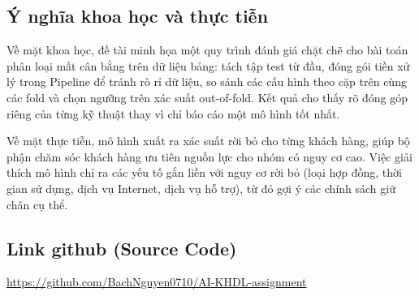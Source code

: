 \subsection{Ý nghĩa khoa học và thực tiễn}
Về mặt khoa học, đề tài minh họa một quy trình đánh giá chặt chẽ cho bài toán phân loại mất cân bằng trên dữ liệu bảng: tách tập test từ đầu, đóng gói tiền xử lý trong Pipeline để tránh rò rỉ dữ liệu, so sánh các cấu hình theo cặp trên cùng các fold và chọn ngưỡng trên xác suất out-of-fold. Kết quả cho thấy rõ đóng góp riêng của từng kỹ thuật thay vì chỉ báo cáo một mô hình tốt nhất.

Về mặt thực tiễn, mô hình xuất ra xác suất rời bỏ cho từng khách hàng, giúp bộ phận chăm sóc khách hàng ưu tiên nguồn lực cho nhóm có nguy cơ cao. Việc giải thích mô hình chỉ ra các yếu tố gắn liền với nguy cơ rời bỏ (loại hợp đồng, thời gian sử dụng, dịch vụ Internet, dịch vụ hỗ trợ), từ đó gợi ý các chính sách giữ chân cụ thể.

\subsection{Link github (Source Code)}
\url{https://github.com/BachNguyen0710/AI-KHDL-assignment}
